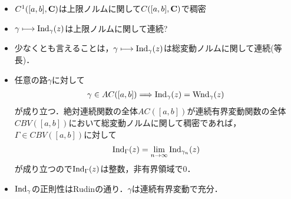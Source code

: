 	\begin{itemize}
		\item $C^1([a,b],\mathbf{C})$は上限ノルムに関して$C([a,b],\mathbf{C})$で稠密
		\item $\gamma \longmapsto \operatorname{Ind}_{\gamma}(z)$は上限ノルムに関して連続?
		\item 少なくとも言えることは，$\gamma \longmapsto \operatorname{Ind}_{\gamma}(z)$は総変動ノルムに関して連続(等長)．
		\item 任意の路$\gamma$に対して
			\begin{align}
				\gamma \in AC([a,b]) \Longrightarrow \operatorname{Ind}_{\gamma}(z) = \operatorname{Wnd}_{\gamma}(z)
			\end{align}
			が成り立つ．絶対連続関数の全体$AC([a,b])$が連続有界変動関数の全体$CBV([a,b])$において総変動ノルムに関して稠密であれば，
			$\Gamma \in CBV([a,b])$に対して
			\begin{align}
				\operatorname{Ind}_{\Gamma}(z) = \lim_{n \to \infty} \operatorname{Ind}_{\gamma_n}(z)
			\end{align}
			が成り立つので$\operatorname{Ind}_{\Gamma}(z)$は整数，非有界領域で$0$．
		\item $\operatorname{Ind}_{\gamma}$の正則性はRudinの通り．$\gamma$は連続有界変動で充分．
	\end{itemize}